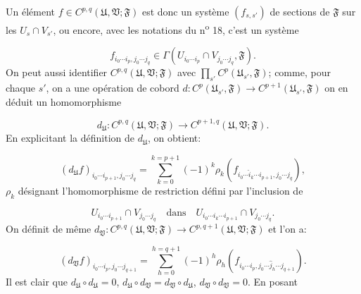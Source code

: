 Un élément $f \in C^{p,q}(\mathfrak{U}, \mathfrak{V}; \mathfrak{F})$ est donc un système $(f_{s,s'})$ de sections de $\mathfrak{F}$ sur les $U_s \cap V_{s'}$, ou encore, avec les notations du n\textsuperscript{o} 18, c'est un système

\begin{equation*}
f_{i_0 \cdots i_p, j_0 \cdots j_q} \in \Gamma(U_{i_0 \cdots i_p} \cap V_{j_0 \cdots j_q}, \mathfrak{F}).
\end{equation*}
On peut aussi identifier $C^{p,q}(\mathfrak{U}, \mathfrak{V}; \mathfrak{F})$ avec $\prod_{s'} C^p(\mathfrak{U}_{s'}, \mathfrak{F})$; comme, pour chaque $s'$, on a une opération de cobord $d:C^p(\mathfrak{U}_{s'}, \mathfrak{F}) \to C^{p+1}(\mathfrak{U}_{s'}, \mathfrak{F})$ on en déduit un homomorphisme

\begin{equation*}
d_{\mathfrak{U}} : C^{p,q}(\mathfrak{U}, \mathfrak{V}; \mathfrak{F}) \to C^{p+1,q}(\mathfrak{U}, \mathfrak{V}; \mathfrak{F}).
\end{equation*}
En explicitant la définition de $d_{\mathfrak{U}}$, on obtient:

\begin{equation*}
(d_{\mathfrak{U}}f)_{i_0 \cdots i_{p+1}, j_0 \cdots j_q} = \sum_{k=0}^{k=p+1} (-1)^k \rho_k(f_{i_0 \cdots \hat{i}_k \cdots i_{p+1}, j_0 \cdots j_q}),
\end{equation*}
$\rho_k$ désignant l'homomorphisme de restriction défini par l'inclusion de

\begin{equation*}
U_{i_0 \cdots i_{p+1}} \cap V_{j_0 \cdots j_q} \quad \text{dans} \quad U_{i_0 \cdots i_k \cdots i_{p+1}} \cap V_{j_0 \cdots j_q}.
\end{equation*}
On définit de même $d_{\mathfrak{V}}:C^{p,q}(\mathfrak{U}, \mathfrak{V}; \mathfrak{F}) \to C^{p,q+1}(\mathfrak{U}, \mathfrak{V}; \mathfrak{F})$ et l'on a:

\begin{equation*}
(d_{\mathfrak{V}}f)_{i_0 \cdots i_p, j_0 \cdots j_{q+1}} = \sum_{h=0}^{h=q+1} (-1)^h \rho_h(f_{i_0 \cdots i_p, j_0 \cdots \hat{j}_h \cdots j_{q+1}}).
\end{equation*}
Il est clair que $d_{\mathfrak{U}} \circ d_{\mathfrak{U}} = 0$, $d_{\mathfrak{U}} \circ d_{\mathfrak{V}} = d_{\mathfrak{V}} \circ d_{\mathfrak{U}}$, $d_{\mathfrak{V}} \circ d_{\mathfrak{V}} = 0$. En posant 




